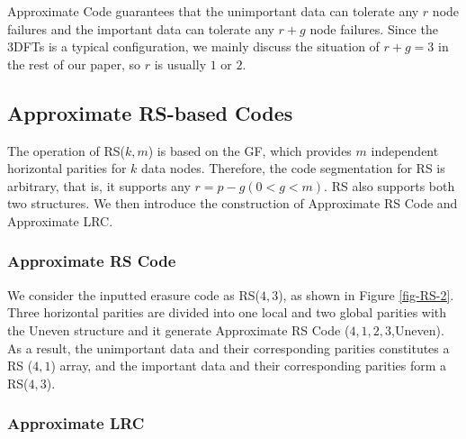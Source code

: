 \documentclass[sigconf]{acmart}
\begin{document}
Approximate Code guarantees that the unimportant data can tolerate any $r$ node failures and the important data can tolerate any $r+g$ node failures.
Since the 3DFTs is a typical configuration, we mainly discuss the situation of $r+g=3$ in the rest of our paper, so $r$ is usually $1$ or $2$.%

\subsection{Approximate RS-based Codes}\label{appr-rsbased}
The operation of RS($k,m$) is based on the GF, which provides $m$ independent horizontal parities for $k$ data nodes. Therefore, the code segmentation for RS is arbitrary, that is, it supports any $r=p-g(0<g<m)$. RS also supports both two structures. We then introduce the construction of Approximate RS Code and Approximate LRC.

\subsubsection{Approximate RS Code}
We consider the inputted erasure code as RS($4,3$), as shown in Figure \ref{fig-RS-2}. Three horizontal parities are divided into one local and two global parities with the Uneven structure and it generate Approximate RS Code ($4,1,2,3$,Uneven).
As a result, the unimportant data and their corresponding parities constitutes a RS ($4,1$) array, and the important data and their corresponding parities form a RS($4,3$).

\subsubsection{Approximate LRC}
\end{document}

